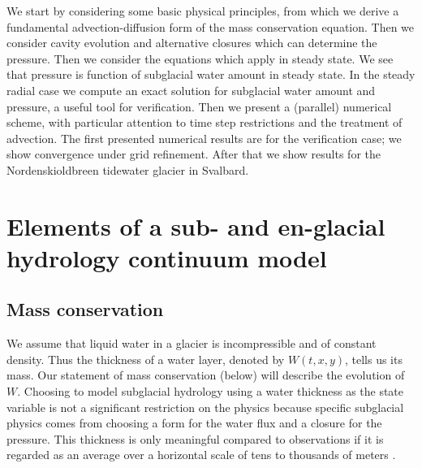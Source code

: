 \documentclass[11pt,final]{amsart}%
\begin{document}
We start by considering some basic physical principles, from which we derive a fundamental advection-diffusion form of the mass conservation equation.  Then we consider cavity evolution and alternative closures which can determine the pressure.    Then we consider the equations which apply in steady state.  We see that pressure is function of subglacial water amount in steady state.  In the steady radial case we compute an exact solution for subglacial water amount and pressure, a useful tool for verification.  Then we present a (parallel) numerical scheme, with particular attention to time step restrictions and the treatment of advection.  The first presented numerical results are for the verification case; we show convergence under grid refinement.  After that we show results for the Nordenskioldbreen tidewater glacier in Svalbard.


\section{Elements of a sub- and en-glacial hydrology continuum model}

\subsection*{Mass conservation}  We assume that liquid water in a glacier is incompressible and of constant density.  Thus the thickness of a water layer, denoted by $W(t,x,y)$, tells us its mass.  Our statement of mass conservation (below) will describe the evolution of $W$.  Choosing to model subglacial hydrology using a water thickness as the state variable is not a significant restriction on the physics because specific subglacial physics comes from choosing a form for the water flux and a closure for the pressure.  This thickness is only meaningful compared to observations if it is regarded as an average over a horizontal scale of tens to thousands of meters \citep{FlowersClarke2002_theory}.
\end{document}
